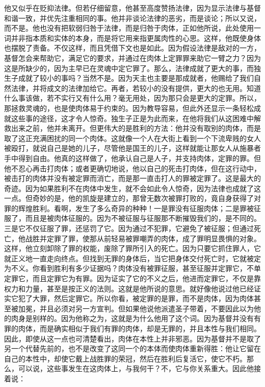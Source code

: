 他又似乎在贬抑法律。但若仔细留意，他甚至高度赞扬法律，因为显示法律与基督和谐一致，并优先注重相同的事。他并非谈论法律的恶劣，而是谈论；所以又说，而不是。他也没有把软弱归咎于法律，而是归咎于肉体，正如他所说，此处使用一词并非指本质和实体的本身，而是将它用来指更属肉性的心思。这样，他既使身体也摆脱了责备。不仅这样，而且凭借下文也是如此。因为假设法律是敌对的一方，基督怎会来帮助它，满足它的要求，并通过在肉体上定罪罪来助它一臂之力？因为这是所缺少的，因为主早已在灵魂中定它罪了。那么，法律成就了更大的事，而独生子成就了较小的事吗？当然不是。因为天主也主要是那成就者，他赐给了我们自然法律，并将成文的法律加给它。再者，若较小的没有提供，更大的也无用。知道什么事该做，若不实行又有什么用？毫无用处，因为那只会是更大的定罪。所以，那拯救灵魂的，也是使肉体易于约束的。因为教导容易，但此外还显示一条轻松成就这些事的途径，这才令人惊奇。独生子正是为此而来，在他将我们从这困难中解救出来之前，他并未离开。但更伟大的是胜利的方法：他并没有取别的肉体，而是取了这正充满困扰的同一个肉体。这就像一个人在大街上看到一个下流卑贱的女人被殴打，就说自己是她的儿子，尽管他是国王的儿子，这样就能让那女人从施暴者手中得到自由。他真的这样做了，他承认自己是人子，并支持肉体，定罪的罪。但他不忍心再击打肉体；或者更确切地说，他以自己的死击打肉体，但在这行动中，被击打的肉体并没有被定罪而消亡，而是那一直击打人的罪被定罪了。这是最大的奇迹。因为如果胜利不在肉体中发生，就不会如此令人惊奇，因为法律也成就了这一点。但奇妙的是，他的凯旋是建立的，那曾无数次被罪打败的，竟自身获得了对罪的辉煌胜利。看啊，发生了多么奇异的种种！一是罪没有征服肉体；二是罪被征服了，而且是被肉体征服的。因为不被征服与征服那不断摧毁我们的，是不同的。三是它不仅征服了罪，还惩罚了它。因为通过不犯罪，它避免了被征服；但通过死亡，他战胜并定罪了罪，使那从前轻易被罪嘲弄的肉体，成了罪明显畏惧的对象。这样，他立刻卸除了罪的权能，废除了罪所引入的死亡。因为只要它抓住罪人，它就正义地一直走向终点。但找到无罪的身体后，当它把身体交付死亡时，它就被定为不义。你看到胜利有多少证据吗？肉体没有被罪征服，甚至征服并定罪它，不单定罪它，而且定罪它为有罪。因为证实了它的不义之后，他进而定罪它，不仅是靠权力和力量，甚至是按正义的法则。这就是他所说的意思。就好像他说过他已经证实它犯了大罪，然后定罪它。所以你看，被定罪的是罪，而不是肉体，因为肉体甚至被加冕，并且必须对另一方宣判。但如果他说他派遣圣子带着，不要因此以为他的肉身是别样的。因为他称之为，这就是为什么他用了这个词。因为基督并没有有罪的肉体，而是确实相似于我们有罪的肉体，却是无罪的，并且本性与我们相同。因此，即使从这一点也可清楚看出，肉体在本性上并非邪恶。因为基督并不是取了另一个代替先前的，也不是改变了这同一个的本体而使肉体重新得胜：他让它留在自己的本性中，却使它戴上战胜罪的荣冠，然后在胜利后复活它，使它不朽。那么，可以说，这些事发生在这肉体上，与我何干？不，它与你关系重大。因此他接着说：\par


